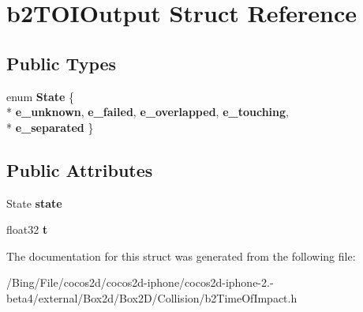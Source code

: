 \hypertarget{structb2_t_o_i_output}{\section{b2\-T\-O\-I\-Output Struct Reference}
\label{structb2_t_o_i_output}
}
\subsection*{Public Types}
\begin{DoxyCompactItemize}
\item 
enum {\bfseries State} \{ \\*
{\bfseries e\-\_\-unknown}, 
{\bfseries e\-\_\-failed}, 
{\bfseries e\-\_\-overlapped}, 
{\bfseries e\-\_\-touching}, 
\\*
{\bfseries e\-\_\-separated}
 \}
\end{DoxyCompactItemize}
\subsection*{Public Attributes}
\begin{DoxyCompactItemize}
\item 
\hypertarget{structb2_t_o_i_output_aaacbf28f437b965ffecabf1407a77915}{State {\bfseries state}}\label{structb2_t_o_i_output_aaacbf28f437b965ffecabf1407a77915}

\item 
\hypertarget{structb2_t_o_i_output_a94f8b756e060892226ec006db4be7ee3}{float32 {\bfseries t}}\label{structb2_t_o_i_output_a94f8b756e060892226ec006db4be7ee3}

\end{DoxyCompactItemize}


The documentation for this struct was generated from the following file\-:\begin{DoxyCompactItemize}
\item 
/\-Bing/\-File/cocos2d/cocos2d-\/iphone/cocos2d-\/iphone-\/2.-\/beta4/external/\-Box2d/\-Box2\-D/\-Collision/b2\-Time\-Of\-Impact.\-h\end{DoxyCompactItemize}
